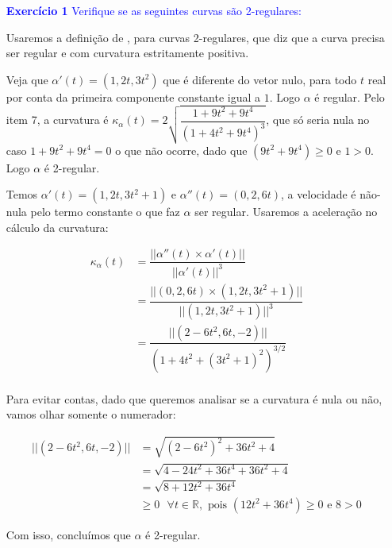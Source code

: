 \documentclass[12pt,letterpaper]{article}
\newcommand{\real}{\mathbb{R}}
\newcommand{\ex}[1]{\textcolor{blue}{\textbf{Exercício #1}}}
\newcommand{\blue}[1]{{\color{blue}{#1}}}
\begin{document}
	\begin{enumerate}
		
		\item [\ex{1}] \textcolor{blue}{Verifique se as seguintes curvas são 2-regulares:}
		\begin{enumerate}[(a)]
			\blue{
			\item $\alpha(t)=(t,t^2,t^3),t\in\real$
			}
			
		Usaremos a definição de \cite{ronaldo}, para curvas 2-regulares, que diz que a curva precisa ser regular e com curvatura estritamente positiva.
		
		Veja que $\alpha'(t)=(1,2t,3t^2)$ que é diferente do vetor nulo, para todo $t$ real por conta da primeira componente  constante igual a $1$. Logo $\alpha$ é regular. Pelo item 7, a curvatura é $\kappa_\alpha(t)=2\sqrt{\dfrac{1+9t^2+9t^4}{(1+4t^2+9t^4)^3}}$, que só seria nula no caso $1+9t^2+9t^4=0$ o que não ocorre, dado que $(9t^2+9t^4)\geq0$ e $1>0$. Logo $\alpha$ é 2-regular.
		
		
		
		\blue{
			\item $\alpha(t)=(t,t^2+2,t^3+t),t\in\real$}
		
		Temos $\alpha'(t)=(1,2t,3t^2+1)$ e $\alpha''(t)=(0,2,6t)$, a velocidade é não-nula pelo termo constante o que faz $\alpha$ ser regular. Usaremos a aceleração no cálculo da curvatura:
		
		\begin{align*}
			\kappa_{\alpha}(t)&=\dfrac{||\alpha''(t)\times\alpha'(t)||}{||\alpha'(t)||^3}\\
			&=\dfrac{||(0,2,6t)\times(1,2t,3t^2+1)||}{||(1,2t,3t^2+1)||^3}\\
			&=\dfrac{||(2-6t^2,6t,-2)||}{(1+4t^2+(3t^2+1)^2)^{3/2}}\\
		\end{align*}
		
		Para evitar contas, dado que queremos analisar se a curvatura é nula ou não, vamos olhar somente o numerador:
		
		\begin{align*}
			||(2-6t^2,6t,-2)||&=\sqrt{(2-6t^2)^2+36t^2+4}\\
			&=\sqrt{4-24t^2+36t^4+36t^2+4}\\
			&=\sqrt{8+12t^2+36t^4}\\
			&\geq0\text{ }\forall t \in \real,\text{ pois } (12t^2+36t^4)\geq0\text{ e } 8>0
		\end{align*}
		
		Com isso, concluímos que $\alpha$ é 2-regular.
	\end{enumerate}


\end{enumerate}
\end{document}
